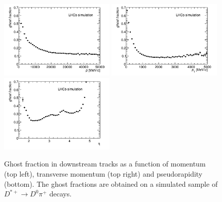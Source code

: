\begin{figure}[tbph]
\begin{center}
\includegraphics[width=0.49\textwidth]{figures/EffPatLLT/overall/DstD0piGhostFracP.png} 
\includegraphics[width=0.49\textwidth]{figures/EffPatLLT/overall/DstD0piGhostFracPt.png}
\includegraphics[width=0.49\textwidth]{figures/EffPatLLT/overall/DstD0piGhostFracEta.png} 
\caption{Ghost fraction in downstream tracks as a function of momentum (top left), transverse momentum (top right) and pseudorapidity (bottom). The ghost fractions are obtained on a simulated sample of $D^{*+} \rightarrow D^{0}\pi^+$ decays.}
\label{fig:ghostsPatLLTDstD0pi}
 \end{center}
 \end{figure}

